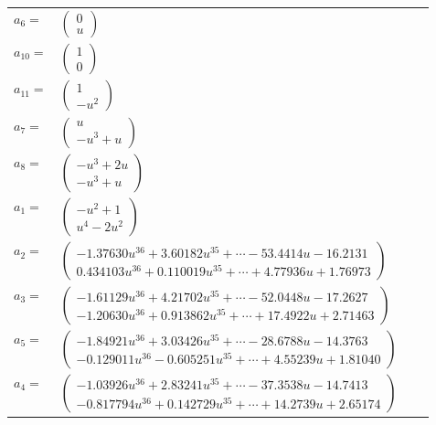 \documentclass[1p]{elsarticle_modified}
\theoremstyle{definition}
\begin{document}
\begin{tabular}{m{7pt} m{180pt} m{7pt} m{180pt} }
\flushright $a_{6}=$&$\begin{pmatrix}0\\u\end{pmatrix}$ \\
\flushright $a_{10}=$&$\begin{pmatrix}1\\0\end{pmatrix}$ \\
\flushright $a_{11}=$&$\begin{pmatrix}1\\- u^2\end{pmatrix}$ \\
\flushright $a_{7}=$&$\begin{pmatrix}u\\- u^3+u\end{pmatrix}$ \\
\flushright $a_{8}=$&$\begin{pmatrix}- u^3+2 u\\- u^3+u\end{pmatrix}$ \\
\flushright $a_{1}=$&$\begin{pmatrix}- u^2+1\\u^4-2 u^2\end{pmatrix}$ \\
\flushright $a_{2}=$&$\begin{pmatrix}-1.37630 u^{36}+3.60182 u^{35}+\cdots-53.4414 u-16.2131\\0.434103 u^{36}+0.110019 u^{35}+\cdots+4.77936 u+1.76973\end{pmatrix}$ \\
\flushright $a_{3}=$&$\begin{pmatrix}-1.61129 u^{36}+4.21702 u^{35}+\cdots-52.0448 u-17.2627\\-1.20630 u^{36}+0.913862 u^{35}+\cdots+17.4922 u+2.71463\end{pmatrix}$ \\
\flushright $a_{5}=$&$\begin{pmatrix}-1.84921 u^{36}+3.03426 u^{35}+\cdots-28.6788 u-14.3763\\-0.129011 u^{36}-0.605251 u^{35}+\cdots+4.55239 u+1.81040\end{pmatrix}$ \\
\flushright $a_{4}=$&$\begin{pmatrix}-1.03926 u^{36}+2.83241 u^{35}+\cdots-37.3538 u-14.7413\\-0.817794 u^{36}+0.142729 u^{35}+\cdots+14.2739 u+2.65174\end{pmatrix}$ \\

\end{tabular}
\end{document}
